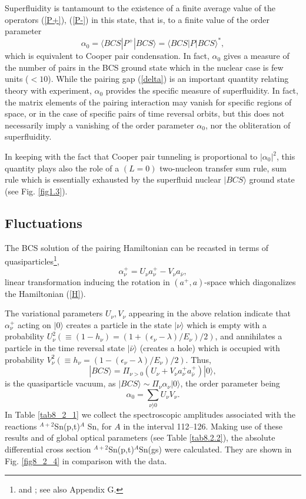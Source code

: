Superfluidity is tantamount to the existence of a finite average value of the operators  (\ref{P+}), (\ref{P-})
in this state, that is, to a finite value of the order parameter
\begin{equation}
\alpha_0 = \langle BCS|P^+|BCS\rangle = \langle BCS|P|BCS\rangle^*,
\end{equation}
 which is equivalent to Cooper pair condensation. In fact, $\alpha_0$ gives  a measure of the 
number of  pairs in the BCS ground state which in the nuclear case is few units ($<10$).
While the pairing gap (\ref{delta}) is an important quantity relating theory with experiment, $\alpha_0$ 
provides the specific measure  of superfluidity. In fact, the matrix elements of the pairing interaction
may vanish for specific regions of space,  or in the case of specific pairs of time reversal orbits, but this does not necessarily
imply a vanishing of the order parameter $\alpha_0$, nor the obliteration of superfluidity.

In keeping with the fact that Cooper pair tunneling is proportional to $|\alpha_0|^2$, this quantity plays also the
role of a $(L=0)$ two-nucleon
transfer sum rule, sum rule which is essentially exhausted by the superfluid nuclear $|BCS\rangle$ ground state (see Fig. \ref{fig1.3}). 
\subsection{Fluctuations}\label{S6.4.1}
The BCS solution of the pairing Hamiltonian can be recasted in terms of quasiparticles\footnote{\cite{Bogoljubov:58} and  \cite{Valatin:58}; see also \cite{Brink:05} Appendix G.}, 
\begin{equation}\label{eq8.2.9}
\alpha^+_{\nu} = U_{\nu} a^+_{\nu} - V_{\nu} a_{\bar \nu},
\end{equation}
linear transformation inducing the rotation in  $(a^+,a)$-space which diagonalizes  the Hamiltonian (\ref{H}).

The variational parameters $U_{\nu},V_{\nu}$ appearing in the above
relation indicate that $\alpha^+_{\nu}$ acting on $|0\rangle$ creates a particle 
in the state $|\nu\rangle$ which is empty with a probability $U^2_{\nu} (\equiv (1 -h_{\nu})=(1+(\epsilon_\nu-\lambda)/E_\nu)/2)$, and annihilates a particle in the time reversal state $|\bar \nu\rangle$
(creates a hole) which is occupied with probability $V_{\nu}^2 (\equiv h_{\nu}=(1-(\epsilon_\nu-\lambda)/E_\nu)/2)$. Thus, 
\begin{equation}\label{eq8.2.10}
|BCS\rangle = \Pi_{\nu>0} (U_{\nu} +V_{\nu} a^+_{\nu}a^+_{\bar \nu}) |0\rangle,
\end{equation}
is the quasiparticle vacuum, as $|BCS\rangle \sim \Pi_{\nu} \alpha_{\nu} |0\rangle$, the order parameter being 
\begin{equation}
\alpha_0 = \sum_{\nu\rangle 0} U_{\nu}V_{\nu}.
\label{UV}
\end{equation}
In Table \ref{tab8_2_1} we collect the spectroscopic amplitudes associated with  the reactions  
$^{A+2}$Sn(p,t)$^A$ Sn, for $A$ in the interval 112--126. Making use of these results and of  global optical parameters (see Table \ref{tab8.2.2}), the absolute differential cross section $^{A+2}$Sn(p,t)$^A$Sn(gs) were calculated. They are shown in Fig. \ref{fig8_2_4} in comparison with the data.
